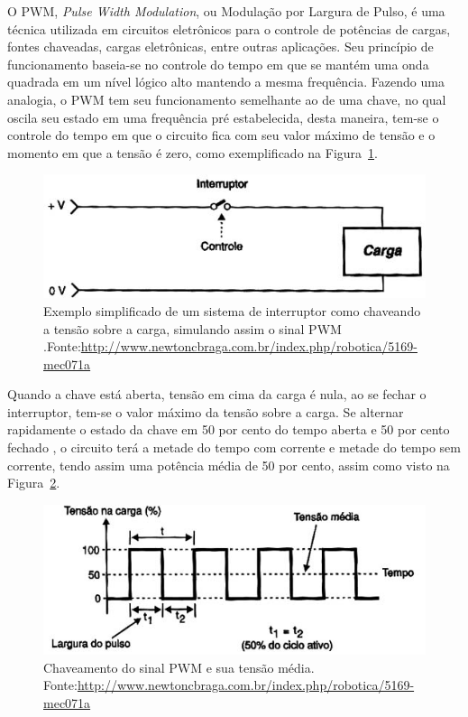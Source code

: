 O PWM, \textit{Pulse Width Modulation}, ou Modulação por Largura de Pulso, é uma técnica utilizada em circuitos eletrônicos para o controle de potências de cargas, fontes chaveadas, cargas eletrônicas, entre outras aplicações. Seu princípio de funcionamento baseia-se no controle do tempo em que se mantém uma onda quadrada em um nível lógico alto mantendo a mesma frequência.
Fazendo uma analogia, o PWM tem seu funcionamento semelhante ao de uma chave, no qual oscila seu estado em uma frequência pré estabelecida, desta maneira, tem-se o controle do tempo em que o circuito fica com seu valor máximo de tensão e o momento em que a tensão é zero, como exemplificado na Figura~\ref{fig:PWM1}. 

\FloatBarrier
\begin{figure}[!htbp]
	\centering
	\includegraphics[scale=0.7]{imagens/PWM1}
	\caption{Exemplo simplificado de um sistema de interruptor como chaveando a tensão sobre a carga, simulando assim o sinal PWM .Fonte:\url{http://www.newtoncbraga.com.br/index.php/robotica/5169-mec071a} }
	
	\label{fig:PWM1}
\end{figure}
\FloatBarrier

Quando a chave está aberta, tensão em cima da carga é nula, ao se fechar o interruptor, tem-se o valor máximo da tensão sobre a carga. Se alternar rapidamente o estado da chave em 50 por cento do tempo aberta e 50 por cento fechado , o circuito terá a metade do tempo com corrente e metade do tempo sem corrente, tendo assim uma potência média de 50 por cento, assim como visto na Figura~\ref{fig:PWM2}.

\FloatBarrier
\begin{figure}[!htbp]
	\centering
	\includegraphics[scale=0.7]{imagens/PWM2}
	\caption{Chaveamento do sinal PWM e sua tensão média. Fonte:\url{http://www.newtoncbraga.com.br/index.php/robotica/5169-mec071a} }%
	
	\label{fig:PWM2}
\end{figure}
\FloatBarrier


